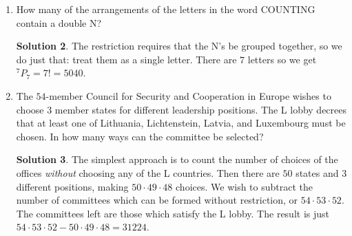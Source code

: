 \documentclass[twocolumn]{article}
\theoremstyle{definition}
\newtheorem*{solution}{Solution}
\begin{document}
\begin{enumerate}
\begin{solution}
            $1001, 1111, 1221, \dots, 9889, 9999$.
            Notice that if we add the first and the last, we get $11000$.
            The same holds if we add the second and the next-to-last and so on.
            Each such pair always sums to $11000$.
            So how many pairs are there?
            There are ten palindromes starting with each digit from $1$ to $9$,
            so there are $90$ palindromes.
            Hence, there are $45$ pairs and our desired sum is $45 \cdot 11000 = 495000$.
        \end{solution}
    \item How many of the arrangements of the letters in the word COUNTING contain
        a double N?
        \begin{solution}
            The restriction requires that the N's be grouped together,
            so we do just that: treat them as a single letter.
            There are $7$ letters so we get $^7P_7 = 7! = 5040$.
        \end{solution}
    \item The $54$-member Council for Security and Cooperation in Europe wishes to 
        choose $3$ member states for different leadership positions.
        The L lobby decrees that at least one of
        Lithuania, Lichtenstein, Latvia, and Luxembourg must be chosen.
        In how many ways can the committee be selected?
        \begin{solution}
            The simplest approach is to count the number of choices of the offices
            \emph{without} choosing any of the L countries.
            Then there are $50$ states and $3$ different positions,
            making $50 \cdot 49 \cdot 48$ choices.
            We wish to subtract the number of committees
            which can be formed without restriction, or $54 \cdot 53 \cdot 52$.
            The committees left are those which satisfy the L lobby.
            The result is just $54 \cdot 53 \cdot 52 - 50 \cdot 49 \cdot 48 = 31224$.
        \end{solution}
\end{enumerate}
\end{document}
